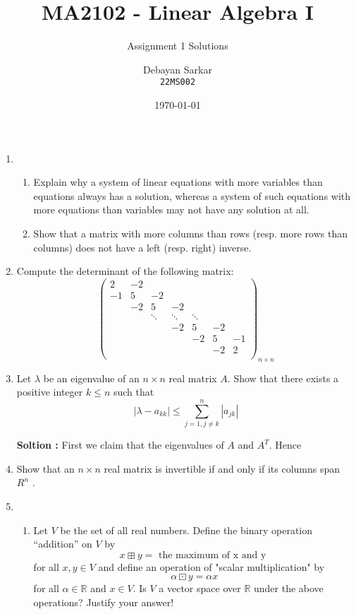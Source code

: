\documentclass[10pt]{scrartcl}
\title{MA2102 - Linear Algebra I}
\subtitle{Assignment 1 Solutions}
\author{Debayan Sarkar \\ \texttt{22MS002}}
\date{\today}
\newcommand{\rn}{\mathbb{R}}
\begin{document}
\maketitle
\begin{enumerate}
    \item
        \begin{enumerate}[label = {(\roman*)}]
            \item Explain why a system of linear equations with more variables than equations always has a
            solution, whereas a system of such equations with more equations than variables may not have
            any solution at all.
            \item Show that a matrix with more columns than rows (resp. more rows than columns) does not
            have a left (resp. right) inverse.
        \end{enumerate}
    \item Compute the determinant of the following matrix:
        \[
        \begin{pmatrix}
            2  & -2 &          &        &         &   &\\
            -1 &  5 & -2       &        &         &   &\\
               & -2 & 5        & -2     &         &   &  \\
               &    & \ddots   & \ddots & \ddots  &   & \\
               &    &          & -2     & 5       &-2 & \\
               &    &          &        & -2      &5  &-1 \\
               &    &          &        &         &-2 & 2\\
        \end{pmatrix}_{n \times n}
        \]
    \item Let $\lambda$ be an eigenvalue of an $n \times n$ real matrix $A$. Show that there
    exists a positive integer $k \leq n$ such that $$|\lambda - a_{kk}| \leq \sum_{j=1,j \neq k}^n|a_{jk}|$$

    \textbf{Soltion :} First we claim that the eigenvalues of $A$ and $A^T$.
    Hence 
    \item Show that an $n \times n$ real matrix is invertible if and only if its columns
    span $R^n$ .
    \item
    \begin{enumerate}[label={(\roman*)}]
        \item Let $V$ be the set of all real numbers. Define the binary operation
        “addition” on $V$ by $$x \boxplus y = \text{ the maximum of x and y }$$ for all $x, y \in V$ and define an operation of "scalar multiplication" by $$\alpha \boxdot y = \alpha x$$ for all $\alpha \in \rn$ and $x \in V$. Is $V$ a vector space over $\rn$ under the above operations? Justify your answer!
        

\end{enumerate}
\end{enumerate}
\end{document}
